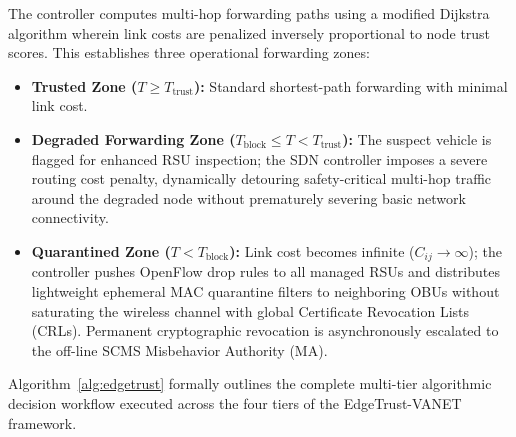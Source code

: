 \documentclass[conference]{IEEEtran}
\begin{document}
The controller computes multi-hop forwarding paths using a modified Dijkstra algorithm wherein link costs are penalized inversely proportional to node trust scores. This establishes three operational forwarding zones:
\begin{itemize}
    \item \textbf{Trusted Zone ($T \ge T_{\text{trust}}$):} Standard shortest-path forwarding with minimal link cost.
    \item \textbf{Degraded Forwarding Zone ($T_{\text{block}} \le T < T_{\text{trust}}$):} The suspect vehicle is flagged for enhanced RSU inspection; the SDN controller imposes a severe routing cost penalty, dynamically detouring safety-critical multi-hop traffic around the degraded node without prematurely severing basic network connectivity.
    \item \textbf{Quarantined Zone ($T < T_{\text{block}}$):} Link cost becomes infinite ($C_{ij} \to \infty$); the controller pushes OpenFlow drop rules to all managed RSUs and distributes lightweight ephemeral MAC quarantine filters to neighboring OBUs without saturating the wireless channel with global Certificate Revocation Lists (CRLs). Permanent cryptographic revocation is asynchronously escalated to the off-line SCMS Misbehavior Authority (MA).
\end{itemize}

Algorithm~\ref{alg:edgetrust} formally outlines the complete multi-tier algorithmic decision workflow executed across the four tiers of the EdgeTrust-VANET framework.
\end{document}
